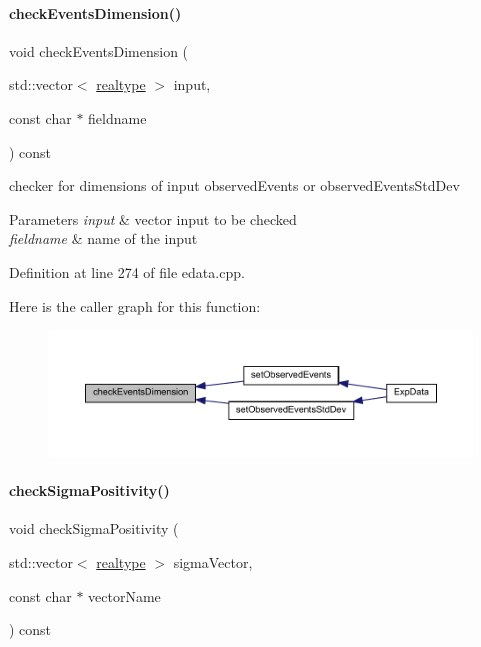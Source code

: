 \paragraph{\texorpdfstring{check\+Events\+Dimension()}{checkEventsDimension()}}
{\footnotesize\ttfamily void check\+Events\+Dimension (\begin{DoxyParamCaption}\item[{std\+::vector$<$ \mbox{\hyperlink{namespaceamici_a1bdce28051d6a53868f7ccbf5f2c14a3}{realtype}} $>$}]{input,  }\item[{const char $\ast$}]{fieldname }\end{DoxyParamCaption}) const\hspace{0.3cm}{\ttfamily [protected]}}

checker for dimensions of input observed\+Events or observed\+Events\+Std\+Dev


\begin{DoxyParams}{Parameters}
{\em input} & vector input to be checked \\
\hline
{\em fieldname} & name of the input \\
\hline
\end{DoxyParams}


Definition at line 274 of file edata.\+cpp.

Here is the caller graph for this function\+:
\nopagebreak
\begin{figure}[H]
\begin{center}
\leavevmode
\includegraphics[width=350pt]{classamici_1_1_exp_data_adcf5587f972fdef595fff78123f5118a_icgraph}
\end{center}
\end{figure}
\mbox{\label{classamici_1_1_exp_data_a30d756faaf9ea395446fbc5c65a7b125}} 
\paragraph{\texorpdfstring{check\+Sigma\+Positivity()}{checkSigmaPositivity()}\hspace{0.1cm}{\footnotesize\ttfamily [1/2]}}
{\footnotesize\ttfamily void check\+Sigma\+Positivity (\begin{DoxyParamCaption}\item[{std\+::vector$<$ \mbox{\hyperlink{namespaceamici_a1bdce28051d6a53868f7ccbf5f2c14a3}{realtype}} $>$}]{sigma\+Vector,  }\item[{const char $\ast$}]{vector\+Name }\end{DoxyParamCaption}) const\hspace{0.3cm}{\ttfamily [protected]}}

